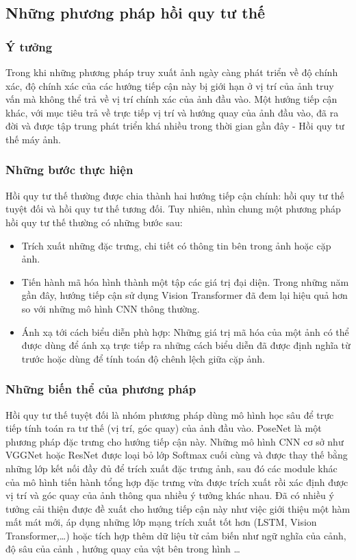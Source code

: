 \subsection{Những phương pháp hồi quy tư thế}
\subsubsection*{Ý tưởng}

Trong khi những phương pháp truy xuất ảnh ngày càng phát triển về độ chính xác, độ chính xác của các hướng tiếp cận này bị giới hạn ở vị trí của ảnh truy vấn mà không thể trả về vị trí chính xác của ảnh đầu vào. Một hướng tiếp cận khác, với mục tiêu trả về trực tiếp vị trí và hướng quay của ảnh đầu vào, đã ra đời và được tập trung phát triển khá nhiều trong thời gian gần đây - Hồi quy tư thế máy ảnh.

\subsubsection*{Những bước thực hiện}

Hồi quy tư thế thường được chia thành hai hướng tiếp cận chính: hồi quy tư thế tuyệt đối và hồi quy tư thế tương đối. Tuy nhiên, nhìn chung một phương pháp hồi quy tư thế thường có những bước sau:
\begin{itemize}
    \item Trích xuất những đặc trưng, chi tiết có thông tin bên trong ảnh hoặc cặp ảnh.
    \item Tiến hành mã hóa hình thành một tập các giá trị đại diện. Trong những năm gần đây, hướng tiếp cận sử dụng Vision Transformer đã đem lại hiệu quả hơn so với những mô hình CNN thông thường.
    \item Ánh xạ tới cách biểu diễn phù hợp: Những giá trị mã hóa của một ảnh có thể được dùng để ánh xạ trực tiếp ra những cách biểu diễn đã được định nghĩa từ trước hoặc dùng để tính toán độ chênh lệch giữa cặp ảnh.
\end{itemize}

\subsubsection*{Những biến thể của phương pháp}

Hồi quy tư thế tuyệt đối là nhóm phương pháp dùng mô hình học sâu để trực tiếp tính toán ra tư thế (vị trí, góc quay) của ảnh đầu vào. PoseNet \cite{kendall2016posenet} là một phương pháp đặc trưng cho hướng tiếp cận này. Những mô hình CNN cơ sở như VGGNet hoặc ResNet được loại bỏ lớp Softmax cuối cùng và được thay thế bằng những lớp kết nối đầy đủ để trích xuất đặc trưng ảnh, sau đó các module khác của mô hình tiến hành tổng hợp đặc trưng vừa được trích xuất rồi xác định được vị trí và góc quay của ảnh thông qua nhiều ý tưởng khác nhau. Đã có nhiều ý tưởng cải thiện được đề xuất cho hướng tiếp cận này như việc giới thiệu một hàm mất mát mới, áp dụng những lớp mạng trích xuất tốt hơn (LSTM, Vision Transformer,\dots) \cite{keetha2023anyloc} hoặc tích hợp thêm dữ liệu từ cảm biến như ngữ nghĩa của cảnh, độ sâu của cảnh \cite{yan2022crossloc}, hướng quay của vật bên trong hình \cite{liu2019lending} \dots

